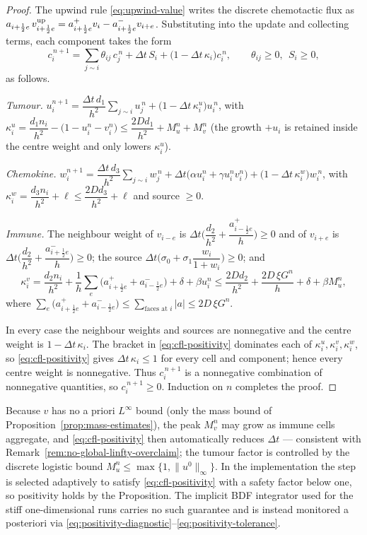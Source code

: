 \documentclass[a4paper,fleqn,longmktitle]{cas-sc}
\theoremstyle{plain}
\theoremstyle{definition}
\numberwithin{equation}{section}
\begin{document}
\begin{proof}
The upwind rule \eqref{eq:upwind-value} writes the discrete chemotactic flux as
$a_{i+\frac12 e}\,v^{\rm up}_{i+\frac12 e}
=a^{+}_{i+\frac12 e}v_i-a^{-}_{i+\frac12 e}v_{i+e}$. Substituting into the update
and collecting terms, each component takes the form
\[
c_i^{\,n+1}=\sum_{j\sim i}\theta_{ij}\,c_j^{\,n}+\Delta t\,S_i
+\bigl(1-\Delta t\,\kappa_i\bigr)c_i^{\,n},
\qquad \theta_{ij}\ge0,\ \ S_i\ge0,
\]
as follows.

\emph{Tumour.}
$u_i^{n+1}=\dfrac{\Delta t\,d_1}{h^2}\sum_{j\sim i}u_j^{\,n}
+\bigl(1-\Delta t\,\kappa_i^{u}\bigr)u_i^{\,n}$, with
$\kappa_i^{u}=\dfrac{d_1 n_i}{h^2}-\bigl(1-u_i^{n}-v_i^{n}\bigr)
\le \dfrac{2D d_1}{h^2}+M_u^n+M_v^n$
(the growth $+u_i$ is retained inside the centre weight and only lowers
$\kappa_i^{u}$).

\emph{Chemokine.}
$w_i^{n+1}=\dfrac{\Delta t\,d_3}{h^2}\sum_{j\sim i}w_j^{\,n}
+\Delta t\bigl(\alpha u_i^{n}+\gamma u_i^{n}v_i^{n}\bigr)
+\bigl(1-\Delta t\,\kappa_i^{w}\bigr)w_i^{\,n}$, with
$\kappa_i^{w}=\dfrac{d_3 n_i}{h^2}+\ell\le \dfrac{2D d_3}{h^2}+\ell$ and source
$\ge0$.

\emph{Immune.}
The neighbour weight of $v_{i-e}$ is
$\Delta t\bigl(\dfrac{d_2}{h^2}+\dfrac{a^{+}_{i-\frac12 e}}{h}\bigr)\ge0$ and of
$v_{i+e}$ is
$\Delta t\bigl(\dfrac{d_2}{h^2}+\dfrac{a^{-}_{i+\frac12 e}}{h}\bigr)\ge0$; the
source $\Delta t\bigl(\sigma_0+\sigma_1\dfrac{w_i}{1+w_i}\bigr)\ge0$; and
\[
\kappa_i^{v}=\frac{d_2 n_i}{h^2}
+\frac1h\sum_{e}\bigl(a^{+}_{i+\frac12 e}+a^{-}_{i-\frac12 e}\bigr)
+\delta+\beta u_i^{n}
\le \frac{2D d_2}{h^2}+\frac{2D\,\xi G^n}{h}+\delta+\beta M_u^n,
\]
where $\sum_{e}\bigl(a^{+}_{i+\frac12 e}+a^{-}_{i-\frac12 e}\bigr)
\le\sum_{\text{faces at }i}|a|\le 2D\,\xi G^n$.

In every case the neighbour weights and sources are nonnegative and the centre
weight is $1-\Delta t\,\kappa_i$. The bracket in \eqref{eq:cfl-positivity}
dominates each of $\kappa_i^{u},\kappa_i^{v},\kappa_i^{w}$, so
\eqref{eq:cfl-positivity} gives $\Delta t\,\kappa_i\le1$ for every cell and
component; hence every centre weight is nonnegative. Thus $c_i^{\,n+1}$ is a
nonnegative combination of nonnegative quantities, so $c_i^{\,n+1}\ge0$.
Induction on $n$ completes the proof.
\end{proof}

\noindent Because $v$ has no a priori $L^\infty$ bound (only the mass bound of
Proposition~\ref{prop:mass-estimates}), the peak $M_v^n$ may grow as immune cells
aggregate, and \eqref{eq:cfl-positivity} then automatically reduces $\Delta t$ ---
consistent with Remark~\ref{rem:no-global-linfty-overclaim}; the tumour factor is
controlled by the discrete logistic bound
$M_u^n\le\max\{1,\|u^0\|_\infty\}$. In the implementation the step is selected
adaptively to satisfy \eqref{eq:cfl-positivity} with a safety factor below one, so
positivity holds by the Proposition. The implicit BDF integrator used for the
stiff one-dimensional runs carries no such guarantee and is instead monitored a
posteriori via \eqref{eq:positivity-diagnostic}--\eqref{eq:positivity-tolerance}.
\end{document}
